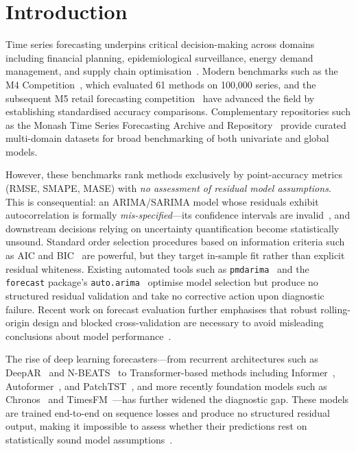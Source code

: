 \documentclass[sn-mathphys-num,pdflatex]{sn-jnl}
\begin{document}
\maketitle

\section{Introduction}
\label{sec:intro}

Time series forecasting underpins critical decision-making across
domains including financial planning, epidemiological surveillance,
energy demand management, and supply chain
optimisation~\cite{hyndman2018forecasting, box2015time, kim2025deeplearningsurvey}.
Modern benchmarks such as the M4 Competition~\cite{makridakis2020m4},
which evaluated 61 methods on 100{,}000 series, and the subsequent
M5 retail forecasting competition~\cite{makridakis2022m5} have advanced the
field by establishing standardised accuracy comparisons.
Complementary repositories such as the Monash Time Series Forecasting
Archive and Repository~\cite{godahewa2021monash} provide curated multi-domain
datasets for broad benchmarking of both univariate and global models.

However, these benchmarks rank methods exclusively by point-accuracy
metrics (RMSE, SMAPE, MASE) with \emph{no assessment of residual
model assumptions}. This is consequential: an ARIMA/SARIMA model
whose residuals exhibit autocorrelation is formally
\emph{mis-specified}---its confidence intervals are
invalid~\cite{box2015time}, and downstream decisions relying on
uncertainty quantification become statistically unsound.
Standard order selection procedures based on information criteria
such as AIC and BIC~\cite{akaike1974aic, schwarz1978bic} are powerful,
but they target in-sample fit rather than explicit residual
whiteness.
Existing automated tools such as \texttt{pmdarima}~\cite{pmdarima}
and the \texttt{forecast} package's \texttt{auto.arima}~\cite{hyndman2008forecast}
optimise model selection but produce no structured residual validation
and take no corrective action upon diagnostic failure.
Recent work on forecast evaluation further emphasises that robust
rolling-origin design and blocked cross-validation are necessary
to avoid misleading conclusions about model performance~\cite{tashman2000oos, bergmeir2012cv, hewamalage2023pitfalls}.

The rise of deep learning forecasters---from recurrent architectures
such as DeepAR~\cite{salinas2020deepar} and N-BEATS~\cite{oreshkin2019nbeats}
to Transformer-based methods including Informer~\cite{zhou2021informer},
Autoformer~\cite{wu2021autoformer}, and PatchTST~\cite{nie2022patchtst},
and more recently foundation models such as Chronos~\cite{ansari2024chronos}
and TimesFM~\cite{das2024timesfm}---has further widened the diagnostic
gap.  These models are trained end-to-end on sequence losses and
produce no structured residual output, making it impossible to
assess whether their predictions rest on statistically sound model
assumptions~\cite{kim2025deeplearningsurvey, kottapalli2025survey}.
\end{document}
